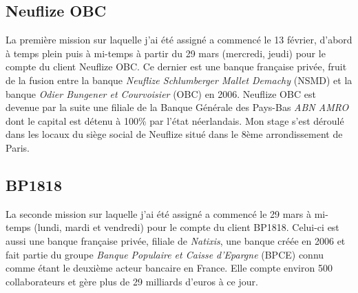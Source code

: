 \subsection{Neuflize OBC}

	La première mission sur laquelle j'ai été assigné a commencé le 13 février, d'abord à temps plein puis à mi-temps à partir du 29 mars (mercredi, jeudi) pour le compte du client Neuflize OBC. Ce dernier est une banque française privée, fruit de la fusion entre la banque \textit{Neuflize Schlumberger Mallet Demachy} (NSMD) et la banque \textit{Odier Bungener et Courvoisier} (OBC) en 2006. Neuflize OBC est devenue par la suite une filiale de la Banque Générale des Pays-Bas \textit{ABN AMRO} dont le capital est détenu à 100\% par l'état néerlandais. Mon stage s'est déroulé dans les locaux du siège social de Neuflize situé dans le 8ème arrondissement de Paris.

\subsection{BP1818}

	La seconde mission sur laquelle j'ai été assigné a commencé le 29 mars à mi-temps (lundi, mardi et vendredi) pour le compte du client BP1818. Celui-ci est aussi une banque française privée, filiale de \textit{Natixis}, une banque créée en 2006 et fait partie du groupe \textit{Banque Populaire et Caisse d'Epargne} (BPCE) connu comme étant le deuxième acteur bancaire en France. Elle compte environ 500 collaborateurs et gère plus de 29 milliards d'euros à ce jour.